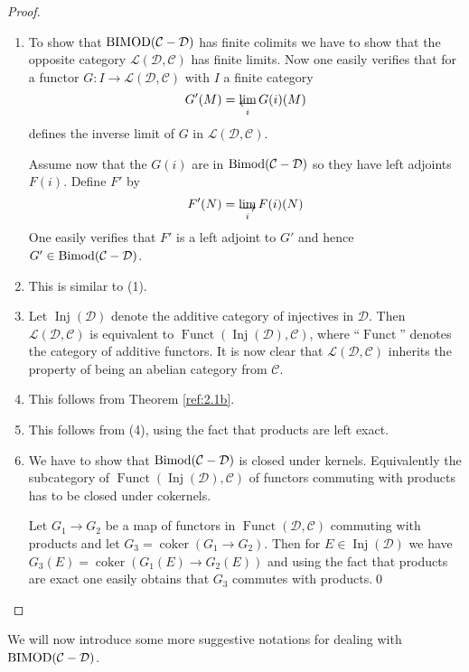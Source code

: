 \documentclass{amsproc}
\def\Cscr{{\mathcal C}}
\def\Dscr{{\mathcal D}}
\def\Lscr{{\mathcal L}}
\def\Bimod{\mathop{\text{Bimod}}}
\def\BIMOD{\mathop{\text{BIMOD}}}
\def\Funct{\operatorname {Funct}}
\def\Inj{\operatorname {Inj}}
\def\coker{\operatorname {coker}}
\def\r{\rightarrow}
\let\oldtext\text
\def\text#1{\oldtext{\upshape #1}}
\let\invlim\projlim
\theoremstyle{definition}
\theoremstyle{remark}
\def\dirlim{\mathop{\vtop{\baselineskip -100pt\lineskip -1pt\lineskiplimit 0pt
\setbox0\hbox{\upshape lim}\copy0\hbox to \wd0{\rightarrowfill}}}\limits}
\def\invlim{\mathop{\vtop{\baselineskip -100pt\lineskip -1pt\lineskiplimit 0pt
\setbox0\hbox{\upshape lim}\copy0\hbox to \wd0{\leftarrowfill}}}\limits}
\numberwithin{equation}{section}
\numberwithin{table}{section}
\numberwithin{figure}{section}
\begin{document}
\begin{proof}
\begin{enumerate}
\item To show that $\BIMOD(\Cscr-\Dscr)$ has finite colimits we have
  to show that the opposite category $\Lscr(\Dscr,\Cscr)$ has finite
  limits. Now one easily verifies that for a functor
  $G:I\r \Lscr(\Dscr,\Cscr)$ with $I$ a finite category
\[
G'(M)=\invlim_i G(i)(M)
\]
defines the inverse limit of $G$ in $\Lscr(\Dscr,\Cscr)$.

Assume now that the $G(i)$ are in $\Bimod(\Cscr-\Dscr)$ so
they have left adjoints $F(i)$.
Define $F'$ by 
\[
F'(N)=\dirlim_i F(i)(N)
\]
One easily verifies that $F'$ is a left adjoint to $G'$ and hence $G'\in
\Bimod(\Cscr-\Dscr)$.
\item This is similar to (1).
\item Let $\Inj(\Dscr)$ denote the additive category of injectives in
  $\Dscr$. Then
$
\Lscr(\Dscr,\Cscr)
$ is equivalent to $\Funct(\Inj(\Dscr),\Cscr)$,
where ``$\Funct$'' denotes the category of additive functors. It is
now clear that $\Lscr(\Dscr,\Cscr)$ inherits the property of being an
abelian category from $\Cscr$.
\item This follows from Theorem \ref{ref:2.1b}.
\item This follows from (4),  using the fact that products are left
  exact.
\item We have to show that $\Bimod(\Cscr-\Dscr)$ is closed under
  kernels. Equivalently the subcategory of
  $\Funct(\Inj(\Dscr),\Cscr)$ of functors commuting with products has to
  be closed under cokernels.

  Let $G_1\r G_2$ be a map of functors in $\Funct(\Dscr,\Cscr)$
  commuting with products and let $G_3=\coker(G_1\r G_2)$. Then for
  $E\in \Inj(\Dscr)$ we have $G_3(E)=\coker(G_1(E)\r G_2(E))$ and
  using the fact that products are exact one easily obtains
  that $G_3$ commutes with products.\qed
\end{enumerate}
\def\qed{}
\end{proof}
We will now introduce some more suggestive notations for dealing with
$\BIMOD(\Cscr-\Dscr)$.
\end{document}

